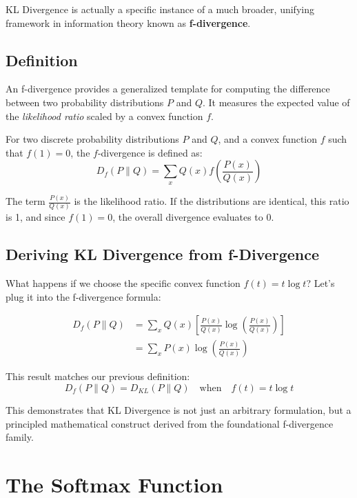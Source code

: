 KL Divergence is actually a specific instance of a much broader, unifying framework in information theory known as \textbf{f-divergence}. 

\subsection{Definition}

An f-divergence provides a generalized template for computing the difference between two probability distributions $P$ and $Q$. It measures the expected value of the \textit{likelihood ratio} scaled by a convex function $f$.

\begin{definition}[f-Divergence]
For two discrete probability distributions $P$ and $Q$, and a convex function $f$ such that $f(1) = 0$, the $f$-divergence is defined as:
\[
\boxed{D_f(P \| Q) = \sum_{x} Q(x) f\left(\frac{P(x)}{Q(x)}\right)}
\]
\end{definition}

The term $\frac{P(x)}{Q(x)}$ is the likelihood ratio. If the distributions are identical, this ratio is 1, and since $f(1) = 0$, the overall divergence evaluates to 0.

\subsection{Deriving KL Divergence from f-Divergence}

What happens if we choose the specific convex function $f(t) = t \log t$? Let's plug it into the f-divergence formula:

\begin{align*}
D_f(P \| Q) &= \sum_{x} Q(x) \left[ \frac{P(x)}{Q(x)} \log \left( \frac{P(x)}{Q(x)} \right) \right] \\
&= \sum_{x} P(x) \log \left( \frac{P(x)}{Q(x)} \right)
\end{align*}

This result matches our previous definition:
\[
D_f(P \| Q) = D_{KL}(P \| Q) \quad \text{when} \quad f(t) = t \log t
\]

This demonstrates that KL Divergence is not just an arbitrary formulation, but a principled mathematical construct derived from the foundational f-divergence family.

\section{The Softmax Function}

